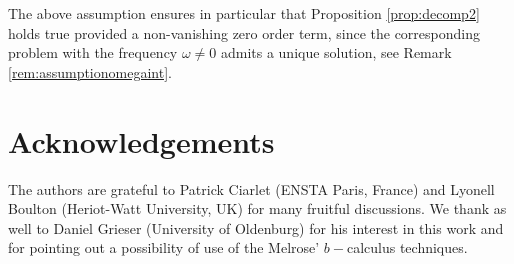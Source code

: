 \documentclass[report]{elsarticle}
\numberwithin{theorem}{section}
\begin{document}
The above assumption ensures in particular that Proposition \ref{prop:decomp2} holds true provided a non-vanishing zero order term, since the  corresponding problem with the frequency $\omega\neq 0$ admits a unique solution, see Remark \ref{rem:assumptionomegaint}. 



%


\section*{Acknowledgements}
The authors are grateful to Patrick Ciarlet (ENSTA Paris, France) and Lyonell Boulton (Heriot-Watt University, UK) for many fruitful discussions. We thank as well to Daniel Grieser (University of Oldenburg) for his interest in this work and for pointing out a possibility of use of the Melrose' $b-$calculus techniques.

	
	
	
	
	
	
	
	
	
	
	
	
\end{document}
